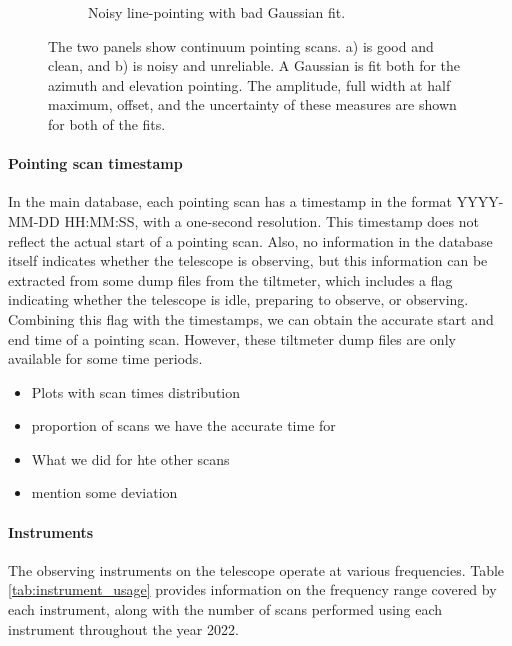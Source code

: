 \begin{figure}[H]
\begin{subfigure}[b]{0.75\textwidth}
         \caption{Noisy line-pointing with bad Gaussian fit.}
         \label{subfig:bad_continuous}
     \end{subfigure}
    \caption{The two panels show continuum pointing scans. a) is good and clean, and b) is noisy and unreliable. 
    A Gaussian is fit both for the azimuth and elevation pointing. The amplitude, full width at half maximum, offset, and the uncertainty of these measures are shown for both of the fits.}
    \label{fig:continueous_pointings}
\end{figure}



\paragraph{Pointing scan timestamp} 
In the main database, each pointing scan has a timestamp in the format YYYY-MM-DD HH:MM:SS, with a one-second resolution.
This timestamp does not reflect the actual start of a pointing scan.
Also, no information in the database itself indicates whether the telescope is observing, but this information can be extracted from some dump files from the tiltmeter, which includes a flag indicating whether the telescope is idle, preparing to observe, or observing.
Combining this flag with the timestamps, we can obtain the accurate start and end time of a pointing scan. However, these tiltmeter dump files are only available for some time periods.

\begin{itemize}
    \item Plots with scan times distribution
    \item proportion of scans we have the accurate time for
    \item What we did for hte other scans
    \item mention some deviation
\end{itemize}

\paragraph{Instruments}
The observing instruments on the telescope operate at various frequencies.
Table \ref{tab:instrument_usage} provides information on the frequency range covered by each instrument,
along with the number of scans performed using each instrument throughout the year 2022.\\

